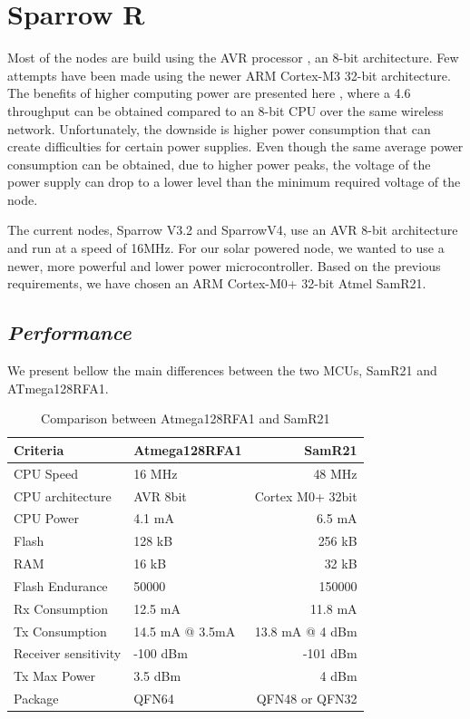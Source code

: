 
\normalfont\normalsize
\chapter{Sparrow R}

Most of the nodes are build using the AVR processor
\cite{currentnodes}\cite{voinescu2013lightweight}, an 8-bit architecture. Few attempts have been made
using the newer ARM Cortex-M3 32-bit architecture. The benefits of higher computing power are presented here
\cite{jurdak2011opal}, where a 4.6 throughput can be obtained compared to an 8-bit CPU over the
same wireless network. Unfortunately, the downside is higher power consumption that can create
difficulties for certain power supplies. Even though the same average power consumption can be obtained, due
to higher power peaks, the voltage of the power supply can drop to a lower level than the minimum
required voltage of the node.

The current nodes, Sparrow V3.2 and SparrowV4, use an AVR 8-bit architecture and run at a speed of
16MHz. For our solar powered node, we wanted to use a newer, more powerful and lower power
microcontroller. Based on the previous requirements, we have chosen an ARM Cortex-M0+ 32-bit Atmel SamR21.


\section{\textit{Performance}}

We present bellow the main differences between the two MCUs, SamR21 and ATmega128RFA1\cite{atmegafa}.

\begin{table} \centering
\begin{tabular}{llr}
\hline
Criteria    & Atmega128RFA1 & SamR21 \\
\hline
CPU Speed      & 16 MHz    & 48 MHz      \\
CPU architecture      & AVR 8bit    & Cortex M0+ 32bit      \\
CPU Power          & 4.1 mA       & 6.5 mA       \\
Flash           & 128 kB        & 256 kB        \\
RAM                 & 16 kB     & 32 kB         \\
Flash Endurance     &  50000    & 150000        \\
Rx Consumption       & 12.5 mA     & 11.8 mA     \\
Tx Consumption       & 14.5 mA @ 3.5mA     & 13.8 mA @ 4 dBm      \\
Receiver sensitivity & -100 dBm      & -101 dBm       \\
Tx Max Power & 3.5 dBm      & 4 dBm       \\
Package & QFN64      & QFN48 or QFN32      \\
\hline
\end{tabular}
\caption{Comparison between Atmega128RFA1 and SamR21}
\end{table}

